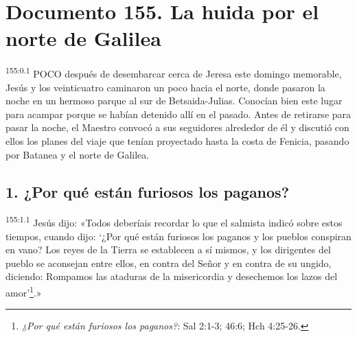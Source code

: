 \chapter{Documento 155. La huida por el norte de Galilea}
\par 
\textsuperscript{155:0.1} POCO después de desembarcar cerca de Jeresa este domingo memorable, Jesús y los veinticuatro caminaron un poco hacia el norte, donde pasaron la noche en un hermoso parque al sur de Betsaida-Julias. Conocían bien este lugar para acampar porque se habían detenido allí en el pasado. Antes de retirarse para pasar la noche, el Maestro convocó a sus seguidores alrededor de él y discutió con ellos los planes del viaje que tenían proyectado hasta la costa de Fenicia, pasando por Batanea y el norte de Galilea.

\section*{1. ¿Por qué están furiosos los paganos?}
\par 
\textsuperscript{155:1.1} Jesús dijo: «Todos deberíais recordar lo que el salmista indicó sobre estos tiempos, cuando dijo: `¿Por qué están furiosos los paganos y los pueblos conspiran en vano? Los reyes de la Tierra se establecen a sí mismos, y los dirigentes del pueblo se aconsejan entre ellos, en contra del Señor y en contra de su ungido, diciendo: Rompamos las ataduras de la misericordia y desechemos los lazos del amor'\footnote{\textit{¿Por qué están furiosos los paganos?}: Sal 2:1-3; 46:6; Hch 4:25-26.}.»

